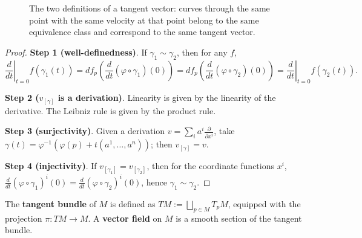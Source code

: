 \begin{figure}[htbp]
\centering
{}
\caption{The two definitions of a tangent vector: curves through the same point with the same velocity at that point belong to the same equivalence class and correspond to the same tangent vector.}
\label{fig:tangent_vector_equivalence}
\end{figure}

\begin{proof}
\textbf{Step 1 (well-definedness)}. If $\gamma_1 \sim \gamma_2$, then for any $f$,
\[
\left. \frac{d}{dt} \right|_{t=0} f(\gamma_1(t)) = df_p\left( \frac{d}{dt}(\varphi\circ\gamma_1)(0) \right) = df_p\left( \frac{d}{dt}(\varphi\circ\gamma_2)(0) \right) = \left. \frac{d}{dt} \right|_{t=0} f(\gamma_2(t)).
\]

\textbf{Step 2 ($v_{[\gamma]}$ is a derivation)}. Linearity is given by the linearity of the derivative. The Leibniz rule is given by the product rule.

\textbf{Step 3 (surjectivity)}. Given a derivation $v = \sum_i a^i \frac{\partial}{\partial x^i}$, take $\gamma(t) = \varphi^{-1}(\varphi(p) + t(a^1, \dots, a^n))$; then $v_{[\gamma]} = v$.

\textbf{Step 4 (injectivity)}. If $v_{[\gamma_1]} = v_{[\gamma_2]}$, then for the coordinate functions $x^i$, $\frac{d}{dt}(\varphi \circ \gamma_1)^i(0) = \frac{d}{dt}(\varphi \circ \gamma_2)^i(0)$, hence $\gamma_1 \sim \gamma_2$.
\end{proof}

\begin{definition}\label{def:tangent_bundle}
The \textbf{tangent bundle} of $M$ is defined as $TM := \bigsqcup_{p \in M} T_pM$, equipped with the projection $\pi: TM \to M$. A \textbf{vector field} on $M$ is a smooth section of the tangent bundle.
\end{definition}

